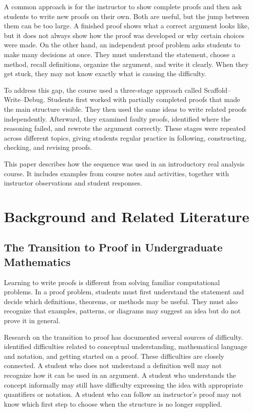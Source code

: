 \documentclass[12pt]{article}
\begin{document}
A common approach is for the instructor to show complete proofs and then ask students to write new proofs on their own. Both are useful, but the jump between them can be too large. A finished proof shows what a correct argument looks like, but it does not always show how the proof was developed or why certain choices were made. On the other hand, an independent proof problem asks students to make many decisions at once. They must understand the statement, choose a method, recall definitions, organize the argument, and write it clearly. When they get stuck, they may not know exactly what is causing the difficulty.

To address this gap, the course used a three-stage approach called Scaffold–Write–Debug. Students first worked with partially completed proofs that made the main structure visible. They then used the same ideas to write related proofs independently. Afterward, they examined faulty proofs, identified where the reasoning failed, and rewrote the argument correctly. These stages were repeated across different topics, giving students regular practice in following, constructing, checking, and revising proofs.

This paper describes how the sequence was used in an introductory real analysis course. It includes examples from course notes and activities, together with instructor observations and student responses.

\section{Background and Related Literature}

\subsection{The Transition to Proof in Undergraduate Mathematics}

Learning to write proofs is different from solving familiar computational problems. In a proof problem, students must first understand the statement and decide which definitions, theorems, or methods may be useful. They must also recognize that examples, patterns, or diagrams may suggest an idea but do not prove it in general.

Research on the transition to proof has documented several sources of difficulty. \textcite{moore1994} identified difficulties related to conceptual understanding, mathematical language and notation, and getting started on a proof. These difficulties are closely connected. A student who does not understand a definition well may not recognize how it can be used in an argument. A student who understands the concept informally may still have difficulty expressing the idea with appropriate quantifiers or notation. A student who can follow an instructor's proof may not know which first step to choose when the structure is no longer supplied.
\end{document}
